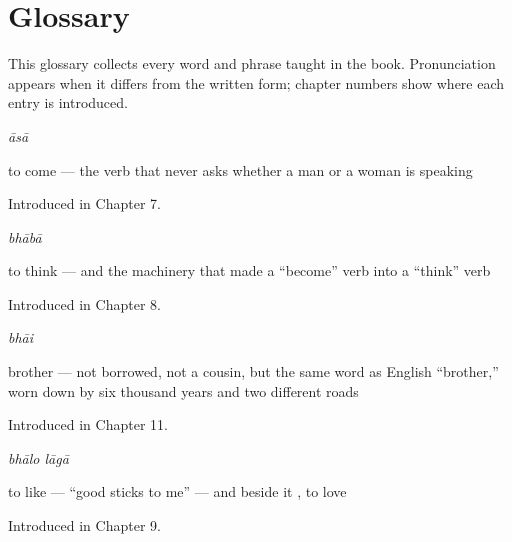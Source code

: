 
\chapter*{Glossary}

This glossary collects every word and phrase taught in the book. Pronunciation appears when it differs from the written form; chapter numbers show where each entry is introduced.

\noindent\begin{minipage}[t]{\linewidth}
\raggedright
\textbf{}\enspace\emph{āsā}\par
\small to come — the verb that never asks whether a man or a woman is speaking\par
\footnotesize Introduced in Chapter 7.
\end{minipage}\par\medskip

\noindent\begin{minipage}[t]{\linewidth}
\raggedright
\textbf{}\enspace\emph{bhābā}\par
\small to think — and the machinery that made a \textquotedblleft{}become\textquotedblright{} verb into a \textquotedblleft{}think\textquotedblright{} verb\par
\footnotesize Introduced in Chapter 8.
\end{minipage}\par\medskip

\noindent\begin{minipage}[t]{\linewidth}
\raggedright
\textbf{}\enspace\emph{bhāi}\par
\small brother — not borrowed, not a cousin, but the same word as English \textquotedblleft{}brother,\textquotedblright{} worn down by six thousand years and two different roads\par
\footnotesize Introduced in Chapter 11.
\end{minipage}\par\medskip

\noindent\begin{minipage}[t]{\linewidth}
\raggedright
\textbf{ }\enspace\emph{bhālo lāgā}\par
\small to like — \textquotedblleft{}good sticks to me\textquotedblright{} — and beside it , to love\par
\footnotesize Introduced in Chapter 9.
\end{minipage}\par\medskip


